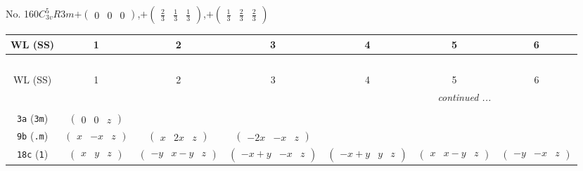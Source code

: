\documentclass[fleqn,9pt,landscape]{jsarticle}
\begin{document}
\newpage
No. 160\quad$C_{3v}^{5}$\quad$R3m$\quad[ trigonal ]\quad$+\begin{pmatrix} 0 & 0 & 0 \end{pmatrix}$,\quad $+\begin{pmatrix} \frac{2}{3} & \frac{1}{3} & \frac{1}{3} \end{pmatrix}$,\quad $+\begin{pmatrix} \frac{1}{3} & \frac{2}{3} & \frac{2}{3} \end{pmatrix}$
\begin{center}
\renewcommand{\arraystretch}{1.2}
\begin{longtable}{ccccccc}
 \hline \hline
WL (SS) & 1 & 2 & 3 & 4 & 5 & 6 \\ \hline \endfirsthead

\multicolumn{6}{l}{\tablename\ \thetable{}} \\
 \hline \hline
WL (SS) & 1 & 2 & 3 & 4 & 5 & 6 \\ \hline \endhead

 \hline \hline
\multicolumn{6}{r}{\footnotesize\it continued ...} \\ \endfoot

 \hline \hline
\multicolumn{6}{r}{} \\ \endlastfoot

{\tt 3a} ({\tt 3m}) & $ \begin{pmatrix} 0 & 0 & z \end{pmatrix} $ & $  $ & $  $ & $  $ & $  $ & $  $ \\ \hline
{\tt 9b} ({\tt .m}) & $ \begin{pmatrix} x & - x & z \end{pmatrix} $ & $ \begin{pmatrix} x & 2 x & z \end{pmatrix} $ & $ \begin{pmatrix} - 2 x & - x & z \end{pmatrix} $ & $  $ & $  $ & $  $ \\ \hline
{\tt 18c} ({\tt 1}) & $ \begin{pmatrix} x & y & z \end{pmatrix} $ & $ \begin{pmatrix} - y & x - y & z \end{pmatrix} $ & $ \begin{pmatrix} - x + y & - x & z \end{pmatrix} $ & $ \begin{pmatrix} - x + y & y & z \end{pmatrix} $ & $ \begin{pmatrix} x & x - y & z \end{pmatrix} $ & $ \begin{pmatrix} - y & - x & z \end{pmatrix} $ \\
\end{longtable}
\end{center}
\end{document}
